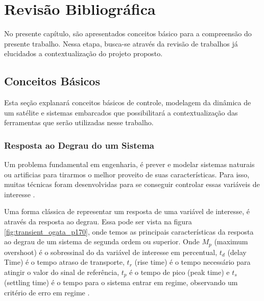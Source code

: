 \chapter{Revisão Bibliográfica}

No presente capítulo, são apresentados conceitos básico para a compreensão do presente trabalho. Nessa etapa, busca-se através da revisão de trabalhos já elucidados a contextualização do projeto proposto.

\section{Conceitos Básicos}

Esta seção explanará conceitos básicos de controle, modelagem da dinâmica de um satélite e sistemas embarcados que possibilitará a contextualização das ferramentas que serão utilizadas nesse trabalho.


\subsection{Resposta ao Degrau do um Sistema}

Um problema fundamental em engenharia, é prever e modelar sistemas naturais ou artificias para tirarmos o melhor proveito de suas características. Para isso, muitas técnicas foram desenvolvidas para se conseguir controlar essas variáveis de interesse \cite{Levine1996}.

Uma forma clássica de representar um resposta de uma variável de interesse, é através da resposta ao degrau. Essa pode ser vista na figura \ref{fig:transient_ogata_p170}, onde temos as principais características da resposta ao degrau de um sistema de segunda ordem ou superior. Onde \textit{$M_p$} (maximum overshoot) é o sobressinal do da variável de interesse em percentual, \textit{$t_d$} (delay Time) é o tempo atraso de transporte, \textit{$t_r$} (rise time) é o tempo necessário para atingir o valor do sinal de referência, \textit{$t_p$} é o tempo de pico (peak time) e \textit{$t_s$} (settling time) é o tempo para o sistema entrar em regime, observando um critério de erro em regime \cite{Ogata}.

